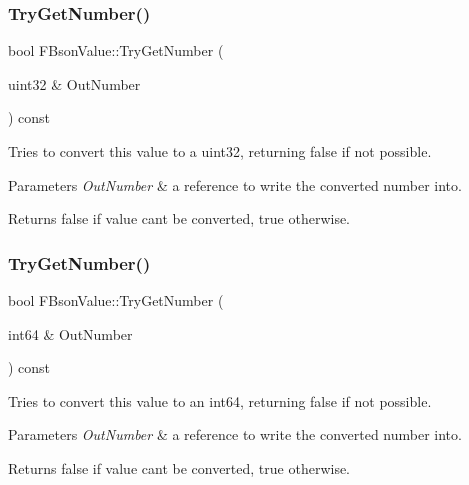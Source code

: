 \subsubsection{\texorpdfstring{Try\+Get\+Number()}{TryGetNumber()}\hspace{0.1cm}{\footnotesize\ttfamily [3/4]}}
{\footnotesize\ttfamily bool F\+Bson\+Value\+::\+Try\+Get\+Number (\begin{DoxyParamCaption}\item[{uint32 \&}]{Out\+Number }\end{DoxyParamCaption}) const}

Tries to convert this value to a uint32, returning false if not possible.


\begin{DoxyParams}{Parameters}
{\em Out\+Number} & a reference to write the converted number into. \\
\hline
\end{DoxyParams}
\begin{DoxyReturn}{Returns}
false if value can\textquotesingle{}t be converted, true otherwise. 
\end{DoxyReturn}
\mbox{\label{class_f_bson_value_a1e929bd6f5834d9a20658299605183f4}} 
\subsubsection{\texorpdfstring{Try\+Get\+Number()}{TryGetNumber()}\hspace{0.1cm}{\footnotesize\ttfamily [4/4]}}
{\footnotesize\ttfamily bool F\+Bson\+Value\+::\+Try\+Get\+Number (\begin{DoxyParamCaption}\item[{int64 \&}]{Out\+Number }\end{DoxyParamCaption}) const}

Tries to convert this value to an int64, returning false if not possible.


\begin{DoxyParams}{Parameters}
{\em Out\+Number} & a reference to write the converted number into. \\
\hline
\end{DoxyParams}
\begin{DoxyReturn}{Returns}
false if value can\textquotesingle{}t be converted, true otherwise. 
\end{DoxyReturn}
\mbox{\label{class_f_bson_value_a8f80bf7d02f1ac317a95fcc99776577b}} 

